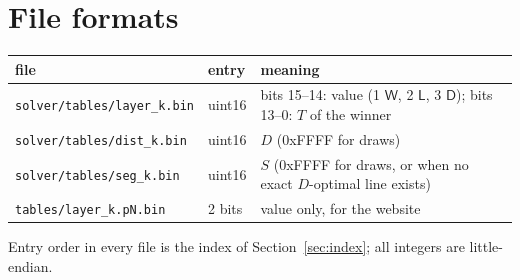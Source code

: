 \documentclass[11pt,a4paper]{article}
\newcommand{\W}{\mathsf{W}}
\newcommand{\Lb}{\mathsf{L}}
\newcommand{\D}{\mathsf{D}}
\begin{document}
\section{File formats}

\begin{center}\small
\begin{tabular}{@{}llp{8.2cm}@{}}
\toprule
file & entry & meaning \\
\midrule
\texttt{solver/tables/layer\_k.bin} & uint16 & bits 15--14: value (1 $\W$, 2 $\Lb$, 3 $\D$); bits 13--0: $T$ of the winner \\
\texttt{solver/tables/dist\_k.bin} & uint16 & $D$ (0xFFFF for draws) \\
\texttt{solver/tables/seg\_k.bin} & uint16 & $S$ (0xFFFF for draws, or when no exact $D$-optimal line exists) \\
\texttt{tables/layer\_k.pN.bin} & 2 bits & value only, for the website \\
\bottomrule
\end{tabular}
\end{center}

Entry order in every file is the index of Section~\ref{sec:index}; all integers
are little-endian.
\end{document}
